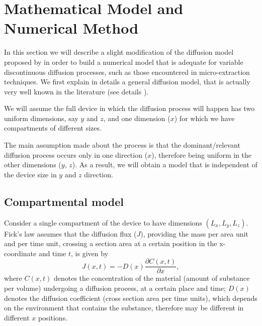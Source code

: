 \documentclass[final,1p,times]{elsarticle}
\begin{document}

\section{Mathematical Model and Numerical Method}
\label{sec:model}

In this section we will describe a slight modification of the diffusion model proposed by \citet{zhang1993headspace} in order to build a numerical model that is adequate for variable discontinuous diffusion processes, such as those encountered in micro-extraction techniques. We first explain in details a general diffusion model, that is actually very well known in the literature (see details \citet{leveque1992numerical}).

We will assume the full device in which the diffusion process will happen has two uniform dimensions, say $y$ and $z$, and one dimension ($x$) for which we have compartments of different sizes. 

The main assumption made about the process is that the dominant/relevant diffusion process occurs only in one direction ($x$), therefore being uniform in the other dimensions ($y$, $z$). As a result, we will obtain a model that is independent of the device size in $y$ and $z$ direction.

\subsection{Compartmental model}

Consider a single compartment of the device to have dimensions $(L_x, L_y, L_z)$. Fick's law assumes that the diffusion flux ($J$), providing the mass per area unit and per time unit, crossing a section area at a certain position in the x-coordinate and time $t$, is given by
\begin{equation}
J(x,t)=-D(x) \frac{\partial C(x,t)}{\partial x},
\end{equation}
where $C(x,t)$ denotes the concentration of the material (amount of substance per volume) undergoing a diffusion process, at a certain place and time; $D(x)$ denotes the diffusion coefficient (cross section area per time units), which depends on the environment that contains the substance, therefore may be different in different $x$ positions.
\end{document}
